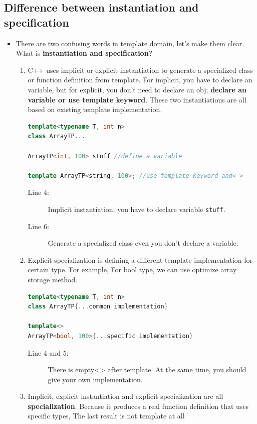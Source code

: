 \documentclass[a4paper,11pt,twoside]{book}
\begin{document}
\subsection{Difference between instantiation and specification}
\begin{itemize}
    \item There are two confusing words in template domain, let's make them clear. What is \textbf{instantiation and specification?}
\begin{enumerate}
	\item C++ uses implicit or explicit instantiation to generate a specialized class or function definition from template. For implicit, you have to declare an variable, but for explicit, you don't need to declare an obj; \textbf{declare an variable or use template keyword}. These two instantiations are all based on existing template implementation.
	
\begin{lstlisting}[frame=single, language=c++]
template<typename T, int n>
class ArrayTP...
	
ArrayTP<int, 100> stuff //define a variable 
	
template ArrayTP<string, 100>; //use template keyword and< >
\end{lstlisting}
\begin{description}
	\item[Line 4:] Implicit instantiation. you have to declare variable \texttt{stuff}.
	\item[Line 6:] Generate a specialized class even you don't declare a variable.
\end{description}

	\item Explicit specialization is defining a different template implementation for certain type. For example, For bool type, we can use optimize array storage method.
\begin{lstlisting}[frame=single, language=c++]
template<typename T, int n>
class ArrayTP{...common implementation}
	
template<>
ArrayTP<bool, 100>{...specific implementation}
\end{lstlisting}
\begin{description}
	\item[Line 4 and 5:] There is empty<> after template. At the same time, you should give your own implementation.
\end{description}
	
	\item Implicit, explicit instantiation and explicit specialization are all \textbf{specialization}. Because it produces a real function definition that uses specific types, The last result is not template at all 
	

\end{enumerate}
\end{itemize}
\end{document}
